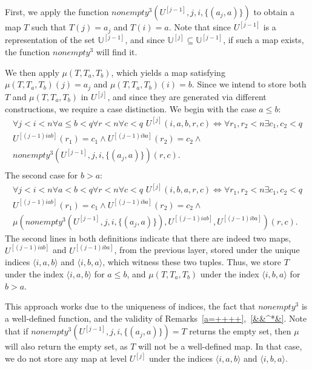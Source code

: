 \documentclass{article}
\theoremstyle{definition}
\theoremstyle{theorem}
\theoremstyle{theorem}
\theoremstyle{remark}
\theoremstyle{remark}
\theoremstyle{example}
\theoremstyle{notation}
\theoremstyle{theorem}
\begin{document}
First, we apply the function $nonempty^3(U^{[j-1]}, j, i, \{(a_j, a)\})$ to obtain a map $T$ such that $T(j) = a_j$ and $T(i) = a$. Note that since $U^{[j-1]}$ is a representation of the set $\mathbb{U}^{[j-1]}$, and since $\mathbb{U}^{[j]} \subseteq \mathbb{U}^{[j-1]}$, if such a map exists, the function $nonempty^3$ will find it.

We then apply $\mu(T, T_a, T_b)$, which yields a map satisfying $\mu(T, T_a, T_b)(j) = a_j$ and $\mu(T, T_a, T_b)(i) = b$. Since we intend to store both $T$ and $\mu(T, T_a, T_b)$ in $U^{[j]}$, and since they are generated via different constructions, we require a case distinction. We begin with the case $a \leq b$:
\begin{equation}
    \begin{gathered}
    \forall j<i<n\forall a\leq b< q \forall r<n\forall c<q \,\, U^{[j]}(i,a,b, r, c) \iff \forall r_1,r_2<n\exists c_1,c_2 <q\\
    U^{[(j-1)iab]}(r_1) = c_1\wedge U^{[(j-1)iba]}(r_2) = c_2 \wedge \\
 nonempty^3(U^{[j-1]}, j,i,\{(a_{j},a)\})(r,c).\\
    \end{gathered}
\end{equation}
The second case for $b>a$:
\begin{equation}
    \begin{gathered}
    \forall j<i<n\forall a< b< q \forall r<n\forall c<q \,\, U^{[j]}(i,b,a, r, c) \iff \forall r_1,r_2<n\exists c_1,c_2 <q\\
    U^{[(j-1)iab]}(r_1) = c_1\wedge U^{[(j-1)iba]}(r_2) = c_2 \wedge \\
\mu(nonempty^3(U^{[j-1]}, j,i,\{(a_{j},a)\}), U^{[(j-1)iab]},  U^{[(j-1)iba]})(r,c).
    \end{gathered}
\end{equation}
The second lines in both definitions indicate that there are indeed two maps, $U^{[(j-1)iab]}$ and $U^{[(j-1)iba]}$, from the previous layer, stored under the unique indices $\langle i, a, b\rangle$ and $\langle i, b, a\rangle$, which witness these two tuples. Thus, we store $T$ under the index $\langle i, a, b \rangle$ for $a \leq b$, and $\mu(T, T_a, T_b)$ under the index $\langle i, b, a \rangle$ for $b > a$.

This approach works due to the uniqueness of indices, the fact that $nonempty^3$ is a well-defined function, and the validity of Remarks~\ref{a=++++},~\ref{&&^*&}. Note that if $nonempty^3(U^{[j-1]}, j, i, \{(a_j, a)\}) = T$ returns the empty set, then $\mu$ will also return the empty set, as $T$ will not be a well-defined map. In that case, we do not store any map at level $U^{[j]}$ under the indices $\langle i, a, b\rangle$ and $\langle i, b, a\rangle$.
\end{document}
